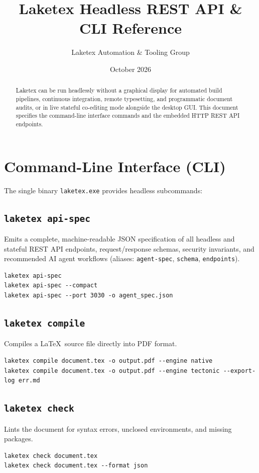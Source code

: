 \documentclass[11pt, a4paper]{article}
\title{\textbf{Laketex Headless REST API \& CLI Reference}}
\author{Laketex Automation \& Tooling Group}
\date{October 2026}
\begin{document}
\maketitle

\begin{abstract}
Laketex can be run headlessly without a graphical display for automated build pipelines, continuous integration, remote typesetting, and programmatic document audits, or in live stateful co-editing mode alongside the desktop GUI. This document specifies the command-line interface commands and the embedded HTTP REST API endpoints.
\end{abstract}

\section{Command-Line Interface (CLI)}

The single binary \texttt{laketex.exe} provides headless subcommands:

\subsection{\texttt{laketex api-spec}}
Emits a complete, machine-readable JSON specification of all headless and stateful REST API endpoints, request/response schemas, security invariants, and recommended AI agent workflows (aliases: \texttt{agent-spec}, \texttt{schema}, \texttt{endpoints}).
\begin{verbatim}
laketex api-spec
laketex api-spec --compact
laketex api-spec --port 3030 -o agent_spec.json
\end{verbatim}

\subsection{\texttt{laketex compile}}
Compiles a \LaTeX\ source file directly into PDF format.
\begin{verbatim}
laketex compile document.tex -o output.pdf --engine native
laketex compile document.tex -o output.pdf --engine tectonic --export-log err.md
\end{verbatim}

\subsection{\texttt{laketex check}}
Lints the document for syntax errors, unclosed environments, and missing packages.
\begin{verbatim}
laketex check document.tex
laketex check document.tex --format json
\end{verbatim}
\end{document}
